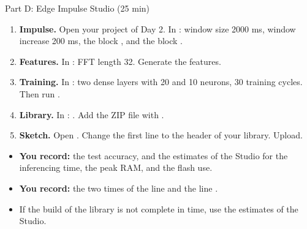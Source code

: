 \begin{frame}{Part D: Edge Impulse Studio (25 min)}
  \small
  \begin{enumerate}
    \item \textbf{Impulse.} Open your project of Day 2. In : window size 2000 ms, window increase 200 ms, the block
          , and the block .
    \item \textbf{Features.} In : FFT length 32.
          Generate the features.
    \item \textbf{Training.} In : two dense layers with 20
          and 10 neurons, 30 training cycles. Then run .
    \item \textbf{Library.} In : .
          Add the ZIP file with .
    \item \textbf{Sketch.} Open .
          Change the first  line to the header of your
          library. Upload.
  \end{enumerate}
  \begin{itemize}
    \item \textbf{You record:} the test accuracy, and the estimates of the
          Studio for the inferencing time, the peak RAM, and the flash use.
    \item \textbf{You record:} the two times of the line  and the line
          .
    \item If the build of the library is not complete in time, use the
          estimates of the Studio.
  \end{itemize}
\end{frame}

